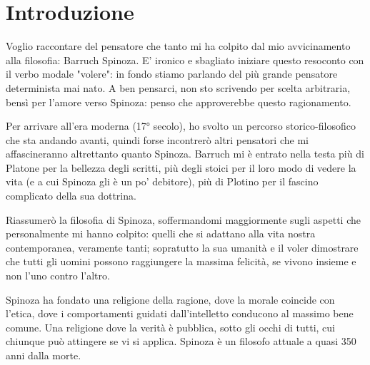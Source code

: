 
\chapter*{Introduzione}

Voglio raccontare del pensatore che tanto mi ha colpito dal mio avvicinamento alla filosofia: Barruch Spinoza. E' ironico e sbagliato iniziare questo resoconto con il verbo modale "volere": in fondo stiamo parlando del più grande pensatore determinista mai nato.
A ben pensarci, non sto scrivendo per scelta arbitraria, bensì per l'amore verso Spinoza: penso che approverebbe questo ragionamento.

Per arrivare all'era moderna (17° secolo), ho svolto un percorso storico-filosofico che sta andando avanti, quindi forse incontrerò  altri pensatori che mi affascineranno altrettanto quanto Spinoza. Barruch mi è entrato nella testa più di Platone per la bellezza degli scritti, più degli stoici per il loro modo di vedere la vita (e a cui Spinoza gli è un po' debitore), più di Plotino per il fascino complicato della sua dottrina.

Riassumerò la filosofia di Spinoza, soffermandomi maggiormente sugli aspetti che  personalmente mi hanno colpito: quelli che si adattano alla vita nostra contemporanea, veramente tanti; sopratutto la sua umanità e il voler dimostrare che tutti gli uomini possono raggiungere la massima felicità, se vivono insieme e non l'uno contro l'altro.

Spinoza ha fondato una religione della ragione, dove la morale coincide con l'etica, dove i comportamenti guidati dall'intelletto conducono al massimo bene comune. Una religione dove la verità è pubblica, sotto gli occhi di tutti, cui chiunque può attingere se vi si applica.
Spinoza è un filosofo attuale a quasi 350 anni dalla morte.


\newpage